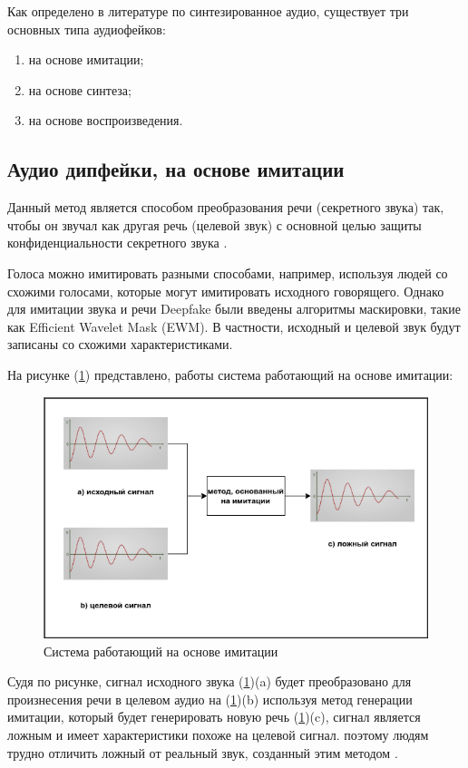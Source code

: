 Как определено в литературе по синтезированное аудио, существует три основных типа аудиофейков:

\begin{enumerate}
    \item на основе имитации;
    \item на основе синтеза;
    \item на основе воспроизведения.
\end{enumerate}

\subsection{Аудио дипфейки, на основе имитации}

Данный метод является способом преобразования речи (секретного звука) так, чтобы он звучал как другая речь (целевой звук) с основной целью защиты конфиденциальности секретного звука \cite{detect-fake-imit}.

Голоса можно имитировать разными способами, например, используя людей со схожими голосами, которые могут имитировать исходного говорящего. Однако для имитации звука и речи Deepfake были введены алгоритмы маскировки, такие как Efficient Wavelet Mask (EWM). В частности, исходный и целевой звук будут записаны со схожими характеристиками. 

На рисунке (\ref{fig:imit-deepfake}) представлено, работы система работающий на основе имитации: 
\begin{figure}[H]
	\centering
	\includegraphics[width=0.5\linewidth]{images/imitation-based-deepfake.png}
	\caption{Система работающий на основе имитации}
	\label{fig:imit-deepfake}
\end{figure}

Судя по рисунке, сигнал исходного звука (\ref{fig:imit-deepfake})(a) будет преобразовано для произнесения речи в целевом аудио на (\ref{fig:imit-deepfake})(b) используя метод генерации имитации, который будет генерировать новую речь (\ref{fig:imit-deepfake})(c), сигнал является ложным и имеет характеристики похоже на целевой сигнал. поэтому людям трудно отличить ложный от реальный звук, созданный этим методом \cite{detect-fake-imit}.


